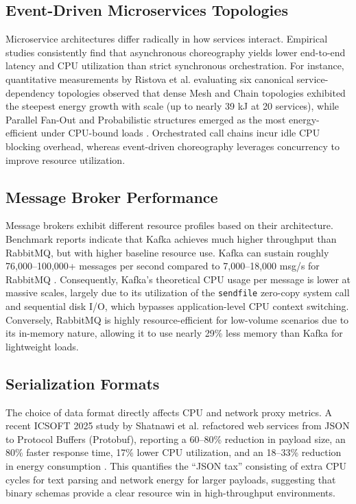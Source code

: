 \documentclass[conference]{IEEEtran}
\begin{document}
\subsection{Event-Driven Microservices Topologies}
Microservice architectures differ radically in how services interact. Empirical studies consistently find that asynchronous choreography yields lower end-to-end latency and CPU utilization than strict synchronous orchestration. For instance, quantitative measurements by Ristova et al. evaluating six canonical service-dependency topologies observed that dense Mesh and Chain topologies exhibited the steepest energy growth with scale (up to nearly 39 kJ at 20 services), while Parallel Fan-Out and Probabilistic structures emerged as the most energy-efficient under CPU-bound loads \cite{b4}. Orchestrated call chains incur idle CPU blocking overhead, whereas event-driven choreography leverages concurrency to improve resource utilization. 

\subsection{Message Broker Performance}
Message brokers exhibit different resource profiles based on their architecture. Benchmark reports indicate that Kafka achieves much higher throughput than RabbitMQ, but with higher baseline resource use. Kafka can sustain roughly 76,000--100,000+ messages per second compared to 7,000--18,000 msg/s for RabbitMQ \cite{b5}. Consequently, Kafka's theoretical CPU usage per message is lower at massive scales, largely due to its utilization of the \texttt{sendfile} zero-copy system call and sequential disk I/O, which bypasses application-level CPU context switching. Conversely, RabbitMQ is highly resource-efficient for low-volume scenarios due to its in-memory nature, allowing it to use nearly 29\% less memory than Kafka for lightweight loads.

\subsection{Serialization Formats}
The choice of data format directly affects CPU and network proxy metrics. A recent ICSOFT 2025 study by Shatnawi et al. refactored web services from JSON to Protocol Buffers (Protobuf), reporting a 60--80\% reduction in payload size, an 80\% faster response time, 17\% lower CPU utilization, and an 18--33\% reduction in energy consumption \cite{b6}. This quantifies the ``JSON tax'' consisting of extra CPU cycles for text parsing and network energy for larger payloads, suggesting that binary schemas provide a clear resource win in high-throughput environments.
\end{document}
